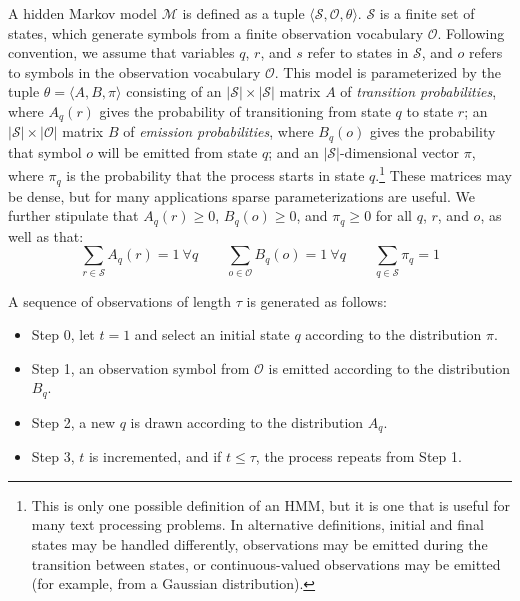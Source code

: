 A hidden Markov model $\mathcal{M}$ is defined as a tuple $\langle
\mathcal{S} , \mathcal{O}, \theta \rangle$.  $\mathcal{S}$ is a finite
set of states, which generate symbols from a finite observation
vocabulary $\mathcal{O}$.  Following convention, we assume that
variables $q$, $r$, and $s$ refer to states in $\mathcal{S}$, and $o$
refers to symbols in the observation vocabulary $\mathcal{O}$. This
model is parameterized by the tuple $\theta=\langle A, B, \pi \rangle$
consisting of an $|\mathcal{S}| \times |\mathcal{S}|$ matrix $A$ of
\emph{transition probabilities}, where $A_{q}(r)$ gives the
probability of transitioning from state $q$ to state $r$; an
$|\mathcal{S}| \times |\mathcal{O}|$ matrix $B$ of \emph{emission
  probabilities}, where $B_{q}(o)$ gives the probability that symbol
$o$ will be emitted from state $q$; and an $|\mathcal{S}|$-dimensional
vector $\pi$, where $\pi_q$ is the probability that the process starts
in state $q$.\footnote{This is only one possible definition of an HMM,
  but it is one that is useful for many text processing problems.  In
  alternative definitions, initial and final states may be handled
  differently, observations may be emitted during the transition
  between states, or continuous-valued observations may be emitted
  (for example, from a Gaussian distribution).}  These matrices may be
dense, but for many applications sparse parameterizations are useful.
We further stipulate that $A_{q}(r) \ge 0$, $B_q(o) \ge 0$, and $\pi_q
\ge 0$ for all $q$, $r$, and $o$, as well as that:
\begin{equation}
\sum_{r \in \mathcal{S}} A_{q}(r) = 1\ \forall q  \quad \quad \sum_{o \in \mathcal{O}} B_{q}(o) = 1\ \forall q   \quad \quad \sum_{q \in \mathcal{S}} \pi_q = 1 
\end{equation}

\noindent A sequence of observations of length $\tau$ is generated as follows:

\begin{itemize}

\item[] Step 0, let $t=1$ and select an initial state $q$ according to the distribution $\pi$.  

\item[] Step 1, an observation symbol from $\mathcal{O}$ is emitted according to the distribution $B_q$. 

\item[] Step 2, a new $q$ is drawn according to the distribution $A_q$.  

\item[] Step 3, $t$ is incremented, and if $t \le \tau$, the process repeats from Step 1.

\end{itemize}

